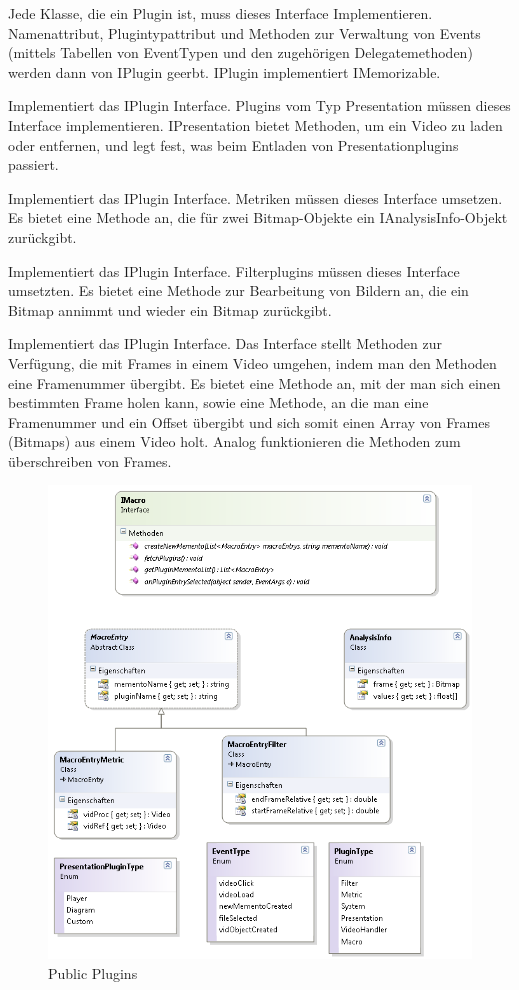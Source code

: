 Jede Klasse, die ein Plugin ist, muss dieses Interface Implementieren. Namenattribut, Plugintypattribut und Methoden zur Verwaltung von Events (mittels Tabellen von EventTypen und den zugehörigen Delegatemethoden) werden dann von IPlugin geerbt. IPlugin implementiert IMemorizable.


Implementiert das IPlugin Interface. Plugins vom Typ Presentation müssen dieses Interface implementieren. IPresentation bietet Methoden, um ein Video zu laden oder entfernen, und legt fest, was beim Entladen von Presentationplugins passiert.


Implementiert das IPlugin Interface. Metriken müssen dieses Interface umsetzen. Es bietet eine Methode an, die für zwei Bitmap-Objekte ein IAnalysisInfo-Objekt zurückgibt.


Implementiert das IPlugin Interface. Filterplugins müssen dieses Interface umsetzten. Es bietet eine Methode zur Bearbeitung von Bildern an, die ein Bitmap annimmt und wieder ein Bitmap zurückgibt.


Implementiert das IPlugin Interface. Das Interface stellt Methoden zur Verfügung, die mit Frames in einem Video umgehen, indem man den Methoden eine Framenummer übergibt. Es bietet eine Methode an, mit der man sich einen bestimmten Frame holen kann, sowie eine Methode, an die man eine Framenummer und ein Offset übergibt und sich somit einen Array von Frames (Bitmaps) aus einem Video holt. Analog funktionieren die Methoden zum überschreiben von Frames.

\begin{figure}[H]
\noindent\includegraphics[width=\linewidth,height=\textheight,
keepaspectratio]{bilder/Klassendiagramm/PluginInterfaces2.png}
\caption{Public Plugins}
\end{figure}

